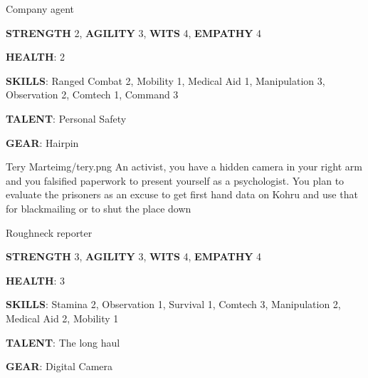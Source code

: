\begin{rpg-commentbox}{}
    Company agent

    \textbf{STRENGTH} 2, \textbf{AGILITY} 3, \textbf{WITS} 4, \textbf{EMPATHY} 4

    \textbf{HEALTH}: 2

    \textbf{SKILLS}: Ranged Combat 2, Mobility 1, Medical Aid 1, Manipulation 3, Observation 2, Comtech 1, Command 3
    
    \textbf{TALENT}: Personal Safety
    
    \textbf{GEAR}: Hairpin
\end{rpg-commentbox}


\newsect

\begin{rpg-pcbox}{Tery Marte}{img/tery.png}
    An activist, you have a hidden camera in your right arm and you falsified paperwork to present yourself as a psychologist. You plan to evaluate the prisoners as an excuse to get first hand data on Kohru and use that for blackmailing or to shut the place down
\end{rpg-pcbox}

\begin{rpg-commentbox}{}
    Roughneck reporter

    \textbf{STRENGTH} 3, \textbf{AGILITY} 3, \textbf{WITS} 4, \textbf{EMPATHY} 4

    \textbf{HEALTH}: 3

    \textbf{SKILLS}: Stamina 2, Observation 1, Survival 1, Comtech 3, Manipulation 2, Medical Aid 2, Mobility 1
    
    \textbf{TALENT}: The long haul
    
    \textbf{GEAR}: Digital Camera
\end{rpg-commentbox}

\newsect
